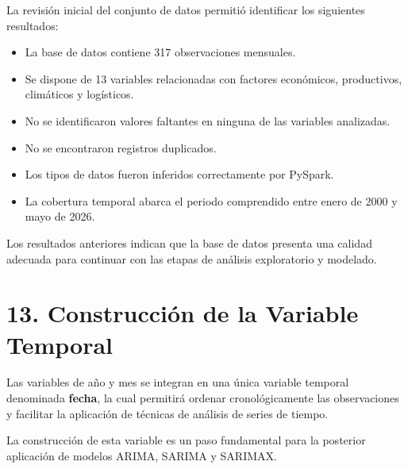 \documentclass[11pt]{article}
\providecommand{\tightlist}{%
      \setlength{\itemsep}{0pt}\setlength{\parskip}{0pt}}
\begin{document}
La revisión inicial del conjunto de datos permitió identificar los
siguientes resultados:

\begin{itemize}
\tightlist
\item
  La base de datos contiene 317 observaciones mensuales.
\item
  Se dispone de 13 variables relacionadas con factores económicos,
  productivos, climáticos y logísticos.
\item
  No se identificaron valores faltantes en ninguna de las variables
  analizadas.
\item
  No se encontraron registros duplicados.
\item
  Los tipos de datos fueron inferidos correctamente por PySpark.
\item
  La cobertura temporal abarca el periodo comprendido entre enero de
  2000 y mayo de 2026.
\end{itemize}

Los resultados anteriores indican que la base de datos presenta una
calidad adecuada para continuar con las etapas de análisis exploratorio
y modelado.

    \hypertarget{construcciuxf3n-de-la-variable-temporal}{%
\section{13. Construcción de la Variable
Temporal}\label{construcciuxf3n-de-la-variable-temporal}}

Las variables de año y mes se integran en una única variable temporal
denominada \textbf{fecha}, la cual permitirá ordenar cronológicamente
las observaciones y facilitar la aplicación de técnicas de análisis de
series de tiempo.

La construcción de esta variable es un paso fundamental para la
posterior aplicación de modelos ARIMA, SARIMA y SARIMAX.
\end{document}
